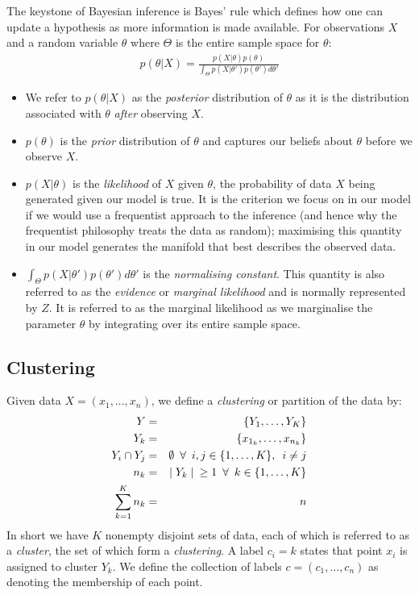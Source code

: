 \documentclass[12pt]{article} %
\begin{document}
	The keystone of Bayesian inference is Bayes' rule which defines how one can update a hypothesis as more information is made available. For observations $X$ and a random variable $\theta$ where $\Theta$ is the entire sample space for $\theta$:
	\begin{align} \label{Bayes_theorem}
	p(\theta | X) = \frac{p(X | \theta) p(\theta)}{\int_\Theta p(X | \theta ') p(\theta ') d \theta '}
	\end{align}
	\begin{itemize}
		\item We refer to $p(\theta | X)$ as the \emph{posterior} distribution of $\theta$ as it is the distribution associated with $\theta$ \emph{after} observing $X$.
		\item $p(\theta)$ is the \emph{prior} distribution of $\theta$ and captures our beliefs about $\theta$ before we observe $X$.
		\item $p(X | \theta)$ is the \emph{likelihood} of $X$ given $\theta$, the probability of data $X$ being generated given our model is true. It is the criterion we focus on in our model if we would use a frequentist approach to the inference (and hence why the frequentist philosophy treats the data as random); maximising this quantity in our model generates the manifold that best describes the observed data. 
		\item $\int_\Theta p(X | \theta ') p(\theta ') d \theta '$ is the \emph{normalising constant}. This quantity is also referred to as the \emph{evidence} \cite{MacKayInformationTheoryInference2003} or \emph{marginal likelihood} and is normally represented by $Z$. It is referred to as the marginal likelihood as we marginalise the parameter $\theta$ by integrating over its entire sample space.
	\end{itemize}
	
	\subsection{Clustering} \label{sec:clustering}
	Given data $X=\left(x_1,\ldots,x_n\right)$, we define a \emph{clustering} or partition of the data by:
	\begin{eqnarray}
	Y &=& \left\{Y_1,\ldots,Y_K\right\} \\
	Y_k &=& \left\{x_{1_k},\ldots, x_{n_k}\right\}  \\
	Y_i \cap Y_j &=& \emptyset \enskip \forall \enskip i,j \in \{1,\ldots,K\}, \enskip i \neq j \\
	n_k & = & \mid Y_k \mid \enskip \geq 1 \enskip \forall \enskip k \in \{1,\ldots,K\} \\
	\sum_{k=1}^Kn_k &=& n
	\end{eqnarray}
	In short we have $K$ nonempty disjoint sets of data, each of which is referred to as a \emph{cluster}, the set of which form a \emph{clustering}. A label $c_i=k$ states that point $x_i$ is assigned to cluster $Y_k$. We define the collection of labels $c=(c_1,\ldots,c_n)$ as denoting the membership of each point.
	
\end{document}
